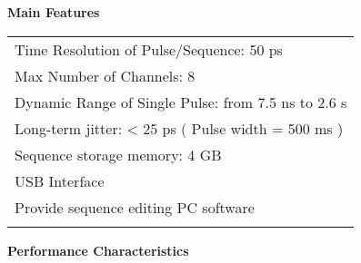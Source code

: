 \makeatletter
\def\hlinewd#1{%
  \noalign{\ifnum0=`}\fi\hrule \@height #1 \futurelet
   \reserved@a\@xhline}
\makeatother
\noindent\sanhao\textbf{Main Features}
\song
\begin{table}[H]
\normalsize
{}
\begin{tabular}{m{13.5cm}}
\rowcolor{gray!20}
\arrayrulecolor{tabcolor_top}\toprule[1.8pt]
Time Resolution of Pulse/Sequence: 50 ps\\\arrayrulecolor{tabcolor}\midrule[1.2pt]
Max Number of Channels: 8 \\\arrayrulecolor{tabcolor}\midrule[1.2pt]
Dynamic Range of Single Pulse: from 7.5 ns to 2.6 s\\\arrayrulecolor{tabcolor}\midrule[1.2pt]
Long-term jitter: < 25 ps ( Pulse width = 500 ms ) \\\arrayrulecolor{tabcolor}\midrule[1.2pt]
Sequence storage memory: 4 GB\\\arrayrulecolor{tabcolor}\midrule[1.2pt]
USB Interface\\\arrayrulecolor{tabcolor}\midrule[1.2pt]
Provide sequence editing PC software\\
\arrayrulecolor{tabcolor_top}\bottomrule[1.8pt]
\end{tabular}
\end{table}


\vspace{0.2cm}
\noindent\xiaosan\textbf{Performance Characteristics}
\vspace{0.5cm}

